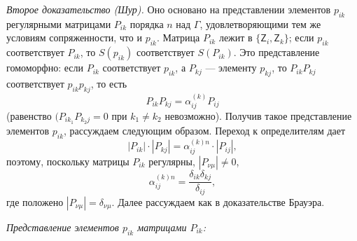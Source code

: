 \documentclass[11pt]{article}
\begin{document}
\emph{Второе доказательство (Шур).} Оно основано на представлении элементов \(p_{ik}\) регулярными матрицами \(P_{ik}\) порядка \(n\) над \(\Gamma\), удовлетворяющими тем же условиям сопряженности, что и \(p_{ik}\). Матрица \(P_{ik}\) лежит в \(\{\mathsf{Z}_i,\mathsf{Z}_k\}\); если \(p_{ik}\) соответствует \(P_{ik}\), то \(S(p_{ik})\) соответствует \(S(P_{ik})\). Это представление гомоморфно: если \(P_{ik}\) соответствует \(p_{ik}\), а \(P_{kj}\) --- элементу \(p_{kj}\), то \(P_{ik}P_{kj}\) соответствует \(p_{ik}p_{kj}\), то есть
\[
P_{ik}P_{kj}=\alpha_{ij}^{(k)}P_{ij}
\]
(равенство \((P_{ik_1}P_{k_2j}=0\) при \(k_1\neq k_2\) невозможно). Получив такое представление элементов \(p_{ik}\), рассуждаем следующим образом. Переход к определителям дает
\[
|P_{ik}|\cdot |P_{kj}|=\alpha_{ij}^{(k)n}\cdot |P_{ij}|,
\]
поэтому, поскольку матрицы \(P_{ik}\) регулярны, \(|P_{\nu\mu}|\ne0\),
\[
\alpha_{ij}^{(k)n}=\frac{\delta_{ik}\delta_{kj}}{\delta_{ij}},
\]
где положено \(|P_{\nu\mu}|=\delta_{\nu\mu}\). Далее рассуждаем как в доказательстве Брауэра.

\emph{Представление элементов \(p_{ik}\) матрицами \(P_{ik}\):}
\end{document}
